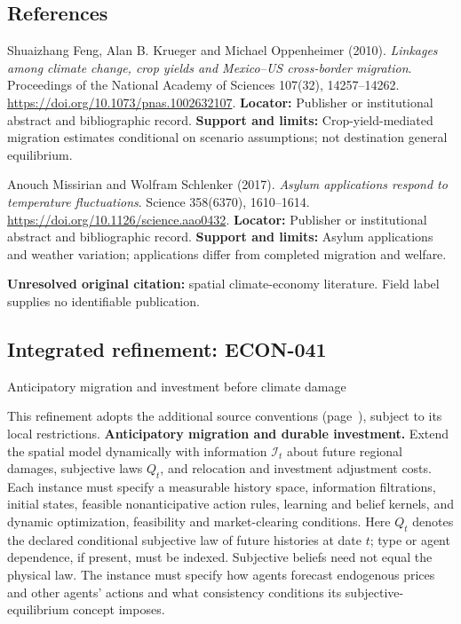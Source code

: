 \documentclass[11pt,a4paper]{article}
\begin{document}
\subsection*{References}

\begin{enumerate}[label={[\textnormal{S}\arabic*]},leftmargin=*]

\item Shuaizhang Feng, Alan B. Krueger and Michael Oppenheimer (2010). \emph{Linkages among climate change, crop yields and Mexico–US cross-border migration}. Proceedings of the National Academy of Sciences 107(32), 14257–14262. \url{https://doi.org/10.1073/pnas.1002632107}. \textbf{Locator:} Publisher or institutional abstract and bibliographic record. \textbf{Support and limits:} Crop-yield-mediated migration estimates conditional on scenario assumptions; not destination general equilibrium.

\item Anouch Missirian and Wolfram Schlenker (2017). \emph{Asylum applications respond to temperature fluctuations}. Science 358(6370), 1610–1614. \url{https://doi.org/10.1126/science.aao0432}. \textbf{Locator:} Publisher or institutional abstract and bibliographic record. \textbf{Support and limits:} Asylum applications and weather variation; applications differ from completed migration and welfare.

\item \textbf{Unresolved original citation:} spatial climate-economy literature. Field label supplies no identifiable publication.

\end{enumerate}

\subsection*{Integrated refinement: ECON-041}
{\sffamily\small\color{muted}Anticipatory migration and investment before climate damage\par}
This refinement adopts the additional source conventions
(page~\pageref{audited:conventions}), subject to its local restrictions.
\textbf{Anticipatory migration and durable investment.}
Extend the spatial model dynamically with information $\mathcal I_t$ about future
regional damages, subjective laws $Q_t$, and relocation and investment adjustment
costs. Each instance must specify a measurable history space, information filtrations, initial states, feasible nonanticipative action rules, learning and belief kernels, and dynamic optimization, feasibility and market-clearing conditions. Here $Q_t$ denotes the declared conditional subjective law of future histories at date $t$; type or agent dependence, if present, must be indexed. Subjective beliefs need not equal the physical law. The instance must specify how agents forecast endogenous prices and other agents' actions and what consistency conditions its subjective-equilibrium concept imposes.
\end{document}

